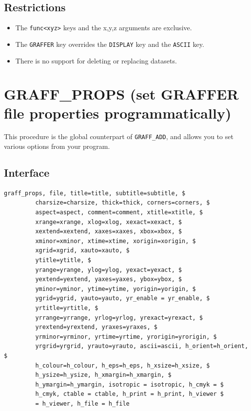 \documentclass[11pt,twoside,english]{article}
\begin{document}
\subsection{Restrictions}

\begin{itemize}
\item The \texttt{func<xyz>} keys and the x,y,z arguments are
  exclusive.
\item The \texttt{GRAFFER} key overrides the \texttt{DISPLAY} key and
  the \texttt{ASCII} key.
\item There is no support for deleting or replacing datasets.
\end{itemize}


\section{GRAFF\_PROPS (set GRAFFER file properties programmatically)}
\label{sec:graff_props}

This procedure is the global counterpart of \texttt{GRAFF\_ADD}, and
allows you to set various options from your program.


\subsection{Interface}
\label{sec:gp_interface}

\begin{verbatim}
graff_props, file, title=title, subtitle=subtitle, $
         charsize=charsize, thick=thick, corners=corners, $
         aspect=aspect, comment=comment, xtitle=xtitle, $
         xrange=xrange, xlog=xlog, xexact=xexact, $
         xextend=xextend, xaxes=xaxes, xbox=xbox, $
         xminor=xminor, xtime=xtime, xorigin=xorigin, $
         xgrid=xgrid, xauto=xauto, $
         ytitle=ytitle, $
         yrange=yrange, ylog=ylog, yexact=yexact, $
         yextend=yextend, yaxes=yaxes, ybox=ybox, $
         yminor=yminor, ytime=ytime, yorigin=yorigin, $
         ygrid=ygrid, yauto=yauto, yr_enable = yr_enable, $
         yrtitle=yrtitle, $
         yrrange=yrrange, yrlog=yrlog, yrexact=yrexact, $
         yrextend=yrextend, yraxes=yraxes, $
         yrminor=yrminor, yrtime=yrtime, yrorigin=yrorigin, $
         yrgrid=yrgrid, yrauto=yrauto, ascii=ascii, h_orient=h_orient, $
         h_colour=h_colour, h_eps=h_eps, h_xsize=h_xsize, $
         h_ysize=h_ysize, h_xmargin=h_xmargin, $
         h_ymargin=h_ymargin, isotropic = isotropic, h_cmyk = $
         h_cmyk, ctable = ctable, h_print = h_print, h_viewer $
         = h_viewer, h_file = h_file
\end{verbatim}
\end{document}
